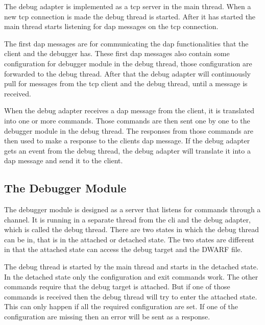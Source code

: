 The debug adapter is implemented as a \gls{tcp} server in the main thread.
When a new \gls{tcp} connection is made the debug thread is started.
After it has started the main thread starts listening for \gls{dap} messages on the \gls{tcp} connection.


The first \gls{dap} messages are for communicating the \gls{dap} functionalities that the client and the debugger has.
These first \gls{dap} messages also contain some configuration for debugger module in the debug thread, those configuration are forwarded to the debug thread.
After that the debug adapter will continuously pull for messages from the \gls{tcp} client and the debug thread, until a message is received.


When the debug adapter receives a \gls{dap} message from the client, it is translated into one or more commands.
Those commands are then sent one by one to the debugger module in the debug thread.
The responses from those commands are then used to make a response to the clients \gls{dap} message.
If the debug adapter gets an event from the debug thread, the debug adapter will translate it into a \gls{dap} message and send it to the client.








\subsection{The Debugger Module}
The debugger module is designed as a server that listens for commands through a channel.
It is running in a separate thread from the \acrshort{cli} and the debug adapter, which is called the debug thread.
There are two states in which the debug thread can be in, that is in the attached or detached state.
The two states are different in that the attached state can access the debug target and the \gls{DWARF} file.


The debug thread is started by the main thread and starts in the detached state.
In the detached state only the configuration and exit commands work.
The other commands require that the debug target is attached.
But if one of those commands is received then the debug thread will try to enter the attached state.
This can only happen if all the required configuration are set.
If one of the configuration are missing then an error will be sent as a response.



